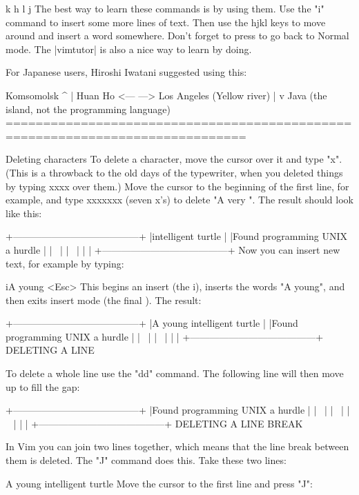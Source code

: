           k
       h     l
         j
The best way to learn these commands is by using them. Use the "i" command to insert some more lines of text. Then use the hjkl keys to move around and insert a word somewhere. Don't forget to press to go back to Normal mode. The |vimtutor| is also a nice way to learn by doing.

For Japanese users, Hiroshi Iwatani suggested using this:

        Komsomolsk
            ^
            |
   Huan Ho  <--- --->  Los Angeles
(Yellow river)      |
            v
          Java (the island, not the programming language)
==============================================================================

Deleting characters
To delete a character, move the cursor over it and type "x". (This is a throwback to the old days of the typewriter, when you deleted things by typing xxxx over them.) Move the cursor to the beginning of the first line, for example, and type xxxxxxx (seven x's) to delete "A very ". The result should look like this:

+---------------------------------------+
|intelligent turtle         |
|Found programming UNIX a hurdle    |
|~                  |
|~                  |
|                   |
+---------------------------------------+
Now you can insert new text, for example by typing:

iA young <Esc>
This begins an insert (the i), inserts the words "A young", and then exits insert mode (the final ). The result:

+---------------------------------------+
|A young intelligent turtle     |
|Found programming UNIX a hurdle    |
|~                  |
|~                  |
|                   |
+---------------------------------------+
DELETING A LINE

To delete a whole line use the "dd" command. The following line will then move up to fill the gap:

+---------------------------------------+
|Found programming UNIX a hurdle    |
|~                  |
|~                  |
|~                  |
|                   |
+---------------------------------------+
DELETING A LINE BREAK

In Vim you can join two lines together, which means that the line break between them is deleted. The "J" command does this. Take these two lines:

A young intelligent
turtle
Move the cursor to the first line and press "J":

